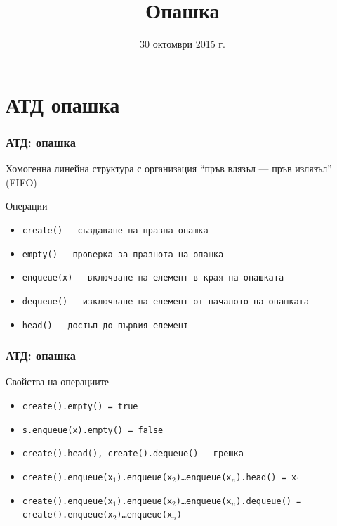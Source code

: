 \documentclass{beamer}
\title{Опашка}
\date{30 октомври 2015 г.}
\begin{document}
\begin{frame}
  \titlepage
\end{frame}

\section{АТД опашка}

\begin{frame}
  \frametitle{АТД: опашка}

  Хомогенна линейна структура с организация ``пръв влязъл --- пръв излязъл'' (FIFO)
  \vspace{1em}

  Операции
  \vspace{0.5em}
  \begin{itemize}
  \item \tt{create()} --- създаване на празна опашка
  \item \tt{empty()} --- проверка за празнота на опашка
  \item \tt{enqueue(x)} --- включване на елемент в края на опашката
  \item \tt{dequeue()} --- изключване на елемент от началото на опашката
  \item \tt{head()} --- достъп до първия елемент
  \end{itemize}
\end{frame}

\begin{frame}
  \frametitle{АТД: опашка}

  Свойства на операциите
  \vspace{0.5em}

  \small
  \begin{itemize}
  \item \tt{create().empty()} = \tt{true}
  \item \tt{s.enqueue(x).empty()} = \tt{false}
  \item \tt{create().head()}, \tt{create().dequeue()} --- \alert{грешка}
  \item \tt{create().enqueue(x$_1$).enqueue(x$_2$)\ldots{}enqueue(x$_n$).head() = x$_1$}
  \item \tt{create().enqueue(x$_1$).enqueue(x$_2$)\ldots{}enqueue(x$_n$).dequeue() = create().enqueue(x$_2$)\ldots{}enqueue(x$_n$)}
  \end{itemize}

\end{frame}
\end{document}
